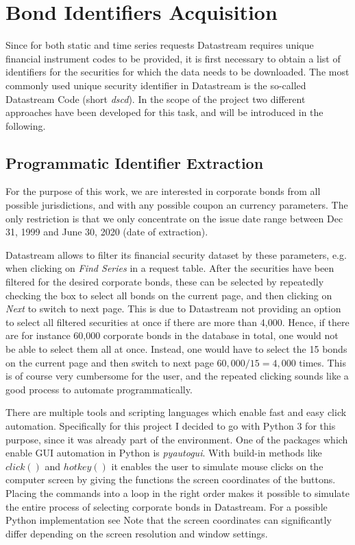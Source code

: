 \section{Bond Identifiers Acquisition}
Since for both static and time series requests Datastream requires unique financial instrument codes to be provided, it is first necessary to obtain a list of identifiers for the securities for which the data needs to be downloaded. The most commonly used unique security identifier in Datastream is the so-called Datastream Code (short \textit{dscd}). In the scope of the project two different approaches have been developed for this task, and will be introduced in the following. 

\subsection{Programmatic Identifier Extraction}
For the purpose of this work, we are interested in corporate bonds from all possible jurisdictions, and with any possible coupon an currency parameters. The only restriction is that we only concentrate on the issue date range between Dec 31, 1999 and June 30, 2020 (date of extraction). 

Datastream allows to filter its financial security dataset by these parameters, e.g. when clicking on \textit{Find Series} in a request table. After the securities have been filtered for the desired corporate bonds, these can be selected by repeatedly checking the box to select all bonds on the current page, and then clicking on \textit{Next} to switch to next page. This is due to Datastream not providing an option to select all filtered securities at once if there are more than 4,000. Hence, if there are for instance 60,000 corporate bonds in the database in total, one would not be able to select them all at once. Instead, one would have to select the 15 bonds on the current page and then switch to next page $60,000 / 15 = 4,000$ times. This is of course very cumbersome for the user, and the repeated clicking sounds like a good process to automate programmatically. 

There are multiple tools and scripting languages which enable fast and easy click automation. Specifically for this project I decided to go with Python 3 for this purpose, since it was already part of the environment. One of the packages which enable GUI automation in Python is \textit{pyautogui}. %
With build-in methods like $click()$ and $hotkey()$ it enables the user to simulate mouse clicks on the computer screen by giving the functions the screen coordinates of the buttons. Placing the commands into a loop in the right order makes it possible to simulate the entire process of selecting corporate bonds in Datastream. For a possible Python implementation see %
Note that the screen coordinates can significantly differ depending on the screen resolution and window settings. 

